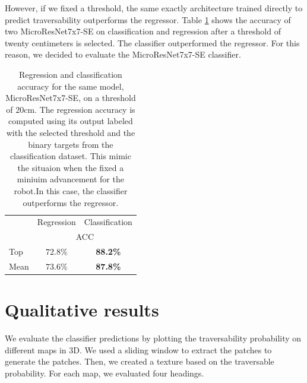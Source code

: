 \documentclass[../document.tex]{subfiles}
\begin{document}
However, if we fixed a threshold, the same exactly architecture trained directly to predict traversability outperforms the regressor. Table \ref{tab : reg-clas} shows the accuracy of two MicroResNet7x7-SE on classification and regression after a threshold of twenty centimeters is selected. The classifier outperformed the regressor. For this reason, we decided to evaluate the MicroResNet7x7-SE classifier. 
\begin{table}[htbp]
  \centering
  \begin{tabular}{@{}lcc@{}}
  \toprule
  &  Regression & Classification  \\
 & \multicolumn{2}{c}{ACC} \\ 
  \cline{2-3}
   Top & $72.8\%$ & \textbf{88.2\%} \\
   Mean & $73.6\%$ & \textbf{87.8\%} \\
  \bottomrule   
\end{tabular}
\caption{Regression and classification accuracy for the same model,  MicroResNet7x7-SE, on a threshold of $20$cm. The regression accuracy is computed using its output labeled with the selected threshold and the binary targets from the classification dataset. This mimic the situaion when the fixed a miniuim advancement for the robot.In this case, the classifier outperforms the regressor.}
\label{tab : reg-clas}
\end{table}
\section{Qualitative results}
We evaluate the classifier predictions by plotting the traversability probability on different maps in 3D. We used a sliding window to extract the patches to generate the patches. Then, we created a texture based on the traversable probability. For each map, we evaluated four headings.
\end{document}
